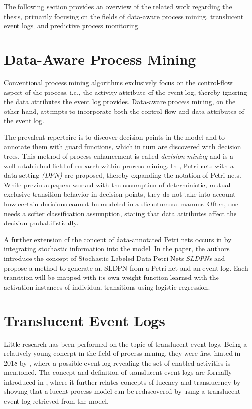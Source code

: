The following section provides an overview of the related work regarding the thesis, primarily focusing on the fields of data-aware process mining, translucent event logs, and predictive process monitoring.

\section{Data-Aware Process Mining}

Conventional process mining algorithms exclusively focus on the control-flow aspect of the process, i.e., the activity attribute of the event log, thereby ignoring the data attributes the event log provides. Data-aware process mining, on the other hand, attempts to incorporate both the control-flow and data attributes of the event log. 

The prevalent repertoire is to discover decision points in the model and to annotate them with guard functions, which in turn are discovered with decision trees. This method of process enhancement is called \emph{decision mining} \cite{decision-mining-in-prom,decision-mining-in-business-processes,data-aware-process-mining} and is a well-established field of research within process mining. In \cite{data-aware-process-mining}, Petri nets with a data setting \emph{(DPN)} are proposed, thereby expanding the notation of Petri nets. While previous papers worked with the assumption of deterministic, mutual exclusive transition behavior in decision points, they do not take into account how certain decisions cannot be modeled in a dichotomous manner. Often, one needs a softer classification assumption, stating that data attributes affect the decision probabilistically.

A further extension of the concept of data-annotated Petri nets occurs in \cite{sldpn} by integrating stochastic information into the model. In the paper, the authors introduce the concept of Stochastic Labeled Data Petri Nets \emph{SLDPNs} and propose a method to generate an SLDPN from a Petri net and an event log. Each transition will be mapped with its own weight function learned with the activation instances of individual transitions using logistic regression.

\section{Translucent Event Logs}

Little research has been performed on the topic of translucent event logs. Being a relatively young concept in the field of process mining, they were first hinted in 2018 by \cite{lucency-first-paper}, where a possible event log revealing the set of enabled activities is mentioned. The concept and definition of translucent event logs are formally introduced in \cite{Translucent-event-logs-first-paper}, where it further relates concepts of lucency and translucency by showing that a lucent process model can be rediscovered by using a translucent event log retrieved from the model.

